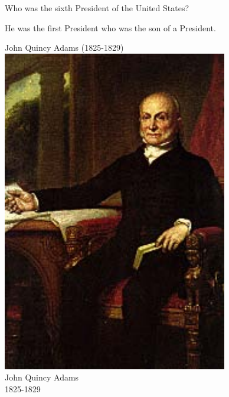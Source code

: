 \documentclass{article}
\def\rescale{.4} %
\begin{document}
\begin{card}
    Who was the sixth President of the United States?
\begin{response}
    \begin{hint}
        He was the first President who was the son of a President.
    \end{hint}
    \begin{answer}
    \ifecListing
        John Quincy Adams (1825-1829)
    \else\centering
            \includegraphics[scale=\rescale]{presidents/ja6}\\
            John Quincy Adams\\
            1825-1829
    \fi
    \end{answer}
\end{response}
\end{card}
\end{document}

